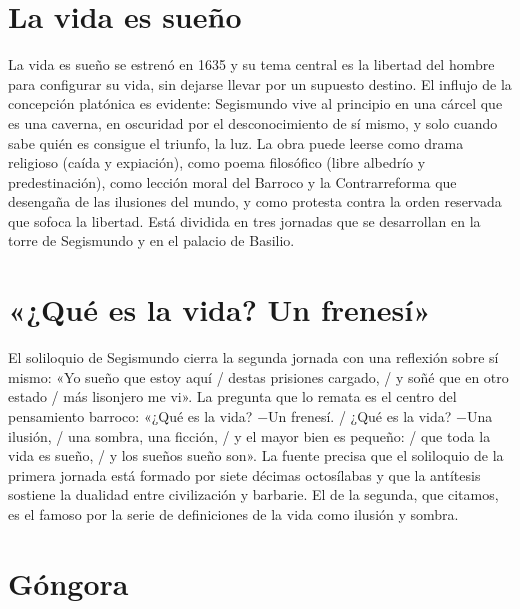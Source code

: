 \documentclass{book}
\begin{document}

\section{La vida es sueño}

La vida es sueño se estrenó en 1635 y su tema central es la libertad del hombre para configurar su vida, sin dejarse llevar por un supuesto destino. El influjo de la concepción platónica es evidente: Segismundo vive al principio en una cárcel que es una caverna, en oscuridad por el desconocimiento de sí mismo, y solo cuando sabe quién es consigue el triunfo, la luz. La obra puede leerse como drama religioso (caída y expiación), como poema filosófico (libre albedrío y predestinación), como lección moral del Barroco y la Contrarreforma que desengaña de las ilusiones del mundo, y como protesta contra la orden reservada que sofoca la libertad. Está dividida en tres jornadas que se desarrollan en la torre de Segismundo y en el palacio de Basilio.


\section{«¿Qué es la vida? Un frenesí»}

El soliloquio de Segismundo cierra la segunda jornada con una reflexión sobre sí mismo: «Yo sueño que estoy aquí / destas prisiones cargado, / y soñé que en otro estado / más lisonjero me vi». La pregunta que lo remata es el centro del pensamiento barroco: «¿Qué es la vida? \(-\)Un frenesí. / ¿Qué es la vida? \(-\)Una ilusión, / una sombra, una ficción, / y el mayor bien es pequeño: / que toda la vida es sueño, / y los sueños sueño son». La fuente precisa que el soliloquio de la primera jornada está formado por siete décimas octosílabas y que la antítesis sostiene la dualidad entre civilización y barbarie. El de la segunda, que citamos, es el famoso por la serie de definiciones de la vida como ilusión y sombra.


\section{Góngora}
\end{document}
